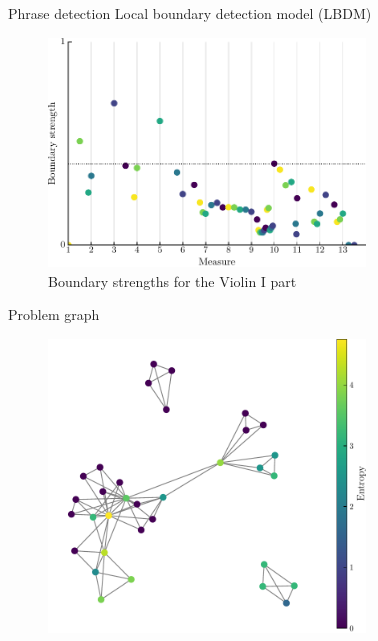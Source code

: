\documentclass[handout]{beamer}
\begin{document}
\begin{frame}{Phrase detection}
    Local boundary detection model (LBDM)
    \begin{figure}
        \centering
        \includegraphics[width=0.75\textwidth]{../Figures/boundary_offset.pdf}
        \caption{Boundary strengths for the Violin I part}
    \end{figure}
\end{frame}

\begin{frame}{Problem graph}
    \begin{figure}
        \centering
        \includegraphics[width=0.75\textwidth]{../Figures/problemGraph.pdf}
    \end{figure}
\end{frame}
\end{document}
